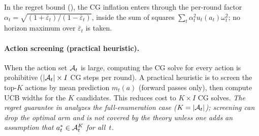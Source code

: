 \documentclass[twoside]{article}
\begin{document}
In the regret bound (), the CG inflation enters through the
per-round factor $\alpha_t = \sqrt{(1{+}\bar\varepsilon_t)/(1{-}\bar\varepsilon_t)}$,
inside the sum of squares $\sum_t\alpha_t^2 u_t(a_t)\omega_t^2$; no horizon
maximum over $\bar\varepsilon_t$ is taken.

\paragraph{Action screening (practical heuristic).}
When the action set $\mathcal{A}_t$ is large, computing the CG solve for every
action is prohibitive ($|\mathcal{A}_t|\times I$ CG steps per round).
A practical heuristic is to screen the top-$K$ actions by mean prediction
$m_t(a)$ (forward passes only), then compute UCB widths for the $K$
candidates.  This reduces cost to $K\times I$ CG solves.
\emph{The regret guarantee in  analyzes the
full-enumeration case ($K=|\mathcal{A}_t|$); screening can drop the optimal arm
and is not covered by the theory unless one adds an assumption that
$a_t^*\in\mathcal{A}_t^K$ for all~$t$.}
\end{document}
